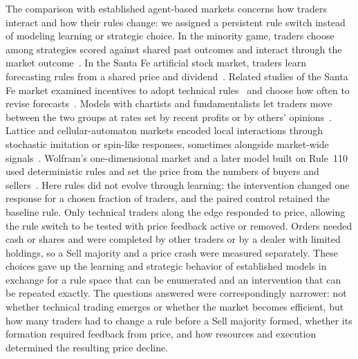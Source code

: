 The comparison with established agent-based markets concerns how traders
interact and how their rules change: we assigned a persistent rule
switch instead of modeling learning or strategic choice. In the minority
game, traders choose among strategies scored against shared past outcomes
and interact through the market outcome~\cite{challet1997minority,challet2000modeling}.
In the Santa Fe artificial stock market, traders learn forecasting rules
from a shared price and dividend~\cite{lebaron1999time}. Related studies of the Santa Fe market examined incentives to adopt technical
rules~\cite{joshi1999technical} and choose how often to revise
forecasts~\cite{joshi2002financial}.
Models with chartists and fundamentalists let traders move between the
two groups at rates set by recent profits or by others'
opinions~\cite{lux1999scaling,brock1998heterogeneous,kirman1993ants}.
Lattice and cellular-automaton markets encoded local interactions
through stochastic imitation or spin-like responses, sometimes alongside
market-wide
signals~\cite{bornholdt2001ising,iori2002microsimulation,bartolozzi2004stochastic,qiu2007cellular,sornette2006importance,fan2009effect,atman2012influence}.
Wolfram's one-dimensional market and a later model built on Rule~110
used deterministic rules and set the price from the numbers of buyers
and sellers~\cite{wolfram2002new,valsan2022on}. Here rules did not evolve
through learning: the intervention changed one response for a chosen
fraction of traders, and the paired control retained the baseline rule.
Only technical traders along the edge responded to price, allowing the
rule switch to be tested with price feedback active or removed. Orders
needed cash or shares and were completed by other traders or by a dealer
with limited holdings, so a Sell majority and a price crash were measured
separately. These choices gave up the learning and strategic behavior of
established models in exchange for a rule space that can be enumerated
and an intervention that can be repeated exactly. The questions answered
were correspondingly narrower: not whether technical trading emerges or
whether the market becomes efficient, but how many traders had to change
a rule before a Sell majority formed, whether its formation required
feedback from price, and how resources and execution determined the
resulting price decline.

